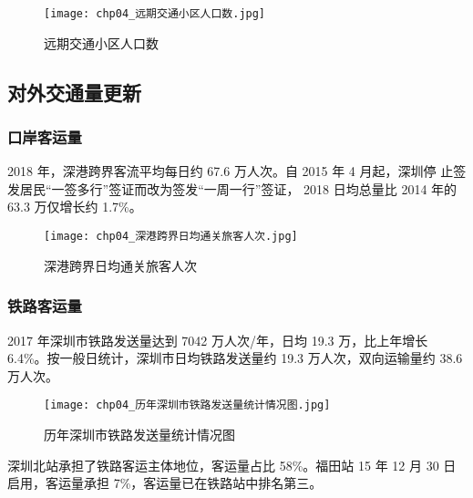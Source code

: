 \begin{figure}[!ht]
  \centering
  \texttt{[image: chp04\_远期交通小区人口数.jpg]}
  \caption{远期交通小区人口数\label{fig:chp04_远期交通小区人口数} }
\end{figure}

\subsection{对外交通量更新}
\subsubsection{口岸客运量}
2018 年，深港跨界客流平均每日约 67.6 万人次。自 2015 年 4 月起，深圳停
止签发居民“一签多行”签证而改为签发“一周一行”签证， 2018 日均总量比
2014 年的 63.3 万仅增长约 1.7\%。

\begin{figure}[!ht]
  \centering
  \texttt{[image: chp04\_深港跨界日均通关旅客人次.jpg]}
  \caption[深港跨界日均通关旅客人次]{深港跨界日均通关旅客人次 \protect\footnotemark\label{fig:chp04_深港跨界日均通关旅客人次}}
\end{figure}

\subsubsection{铁路客运量}
2017 年深圳市铁路发送量达到 7042 万人次/年，日均 19.3 万，比上年增长
6.4\%。按一般日统计，深圳市日均铁路发送量约 19.3 万人次，双向运输量约 38.6万人次。\clearpage

\begin{figure}[!ht]
  \centering
  \texttt{[image: chp04\_历年深圳市铁路发送量统计情况图.jpg]}
  \caption[历年深圳市铁路发送量统计情况图]{历年深圳市铁路发送量统计情况图 \protect\footnotemark} \label{fig:chp04_历年深圳市铁路发送量统计情况图}
\end{figure}

深圳北站承担了铁路客运主体地位，客运量占比 58\%。福田站 15 年 12 月
30 日启用，客运量承担 7\%，客运量已在铁路站中排名第三。

